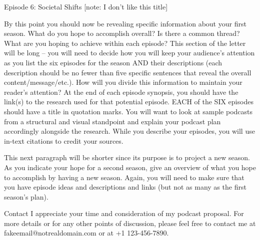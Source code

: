\documentclass[12pt]{article}
\begin{document}
Episode 6: Societal Shifts [note: I don’t like this title]

By this point you should now be revealing specific information about your first season. What do you hope to accomplish overall? Is there a common thread? What are you hoping to achieve within each episode? This section of the letter will be long – you will need to decide how you will keep your audience’s attention as you list the six episodes for the season AND their descriptions (each description should be no fewer than five specific sentences that reveal the overall content/message/etc.). How will you divide this information to maintain your reader’s attention? At the end of each episode synopsis, you should have the link(s) to the research used for that potential episode. EACH of the SIX episodes should have a title in quotation marks. You will want to look at sample podcasts from a structural and visual standpoint and explain your podcast plan accordingly alongside the research. While you describe your episodes, you will use in-text citations to credit your sources.

This next paragraph will be shorter since its purpose is to project a new season. As you indicate your hope for a second season, give an overview of what you hope to accomplish by having a new season. Again, you will need to make sure that you have episode ideas and descriptions and links (but not as many as the first season’s plan).

Contact
I appreciate your time and consideration of my podcast proposal. For more details or for any other points of discussion, please feel free to contact me at fakeemail@notrealdomain.com or at +1 123-456-7890.
\end{document}
